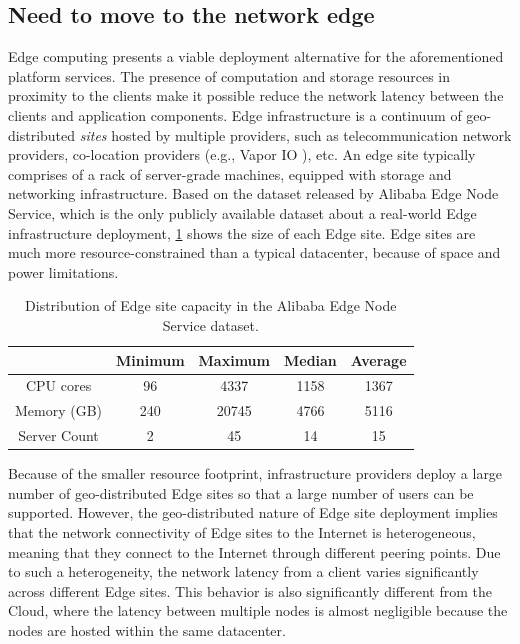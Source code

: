 \subsection{Need to move to the network edge}
Edge computing \cite{ramachandran2021case} presents a viable deployment alternative for the aforementioned platform services. The presence of computation and storage resources in proximity to the clients make it possible reduce the network latency between the clients and application components. Edge infrastructure is a continuum of geo-distributed \emph{sites} hosted by multiple providers, such as telecommunication network providers, co-location providers (e.g., Vapor IO \cite{vaporio}), etc. An edge site typically comprises of a rack of server-grade machines, equipped with storage and networking infrastructure. Based on the dataset \cite{xu2021cloud} released by Alibaba Edge Node Service, which is the only publicly available dataset about a real-world Edge infrastructure deployment, \cref{table:edge_capacity} shows the size of each Edge site. Edge sites are much more resource-constrained than a typical datacenter, because of space and power limitations. 
\begin{table}[h!]
\centering
\caption{Distribution of Edge site capacity in the Alibaba Edge Node Service dataset.}
  \label{table:edge_capacity}
 \begin{tabular}{||c | c | c | c | c ||} 
 \hline
  & Minimum & Maximum & Median & Average \\ [0.5ex] 
 \hline\hline
 CPU cores      & 96  & 4337 & 1158 & 1367 \\ 
 \hline
 Memory (GB)    &  240 & 20745 & 4766 & 5116\\
 \hline
 Server Count   &  2 & 45 & 14 & 15 \\
 \hline
 \end{tabular}
 
\end{table}

Because of the smaller resource footprint, infrastructure providers deploy a large number of geo-distributed Edge sites so that a large number of users can be supported. However, the geo-distributed nature of Edge site deployment implies that the network connectivity of Edge sites to the Internet is heterogeneous, meaning that they connect to the Internet through different peering points. Due to such a heterogeneity, the network latency from a client varies significantly across different Edge sites. This behavior is also significantly different from the Cloud, where the latency between multiple nodes is almost negligible because the nodes are hosted within the same datacenter. 


